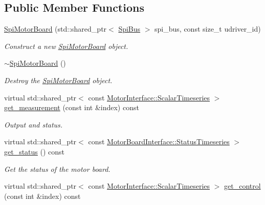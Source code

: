 \subsection*{Public Member Functions}
\begin{DoxyCompactItemize}
\item 
\hyperlink{classblmc__drivers_1_1SpiMotorBoard_a740572d586d73b678a177bc3de351f8b}{Spi\+Motor\+Board} (std\+::shared\+\_\+ptr$<$ \hyperlink{classblmc__drivers_1_1SpiBus}{Spi\+Bus} $>$ spi\+\_\+bus, const size\+\_\+t udriver\+\_\+id)
\begin{DoxyCompactList}\small\item\em Construct a new \hyperlink{classblmc__drivers_1_1SpiMotorBoard}{Spi\+Motor\+Board} object. \end{DoxyCompactList}\item 
\hyperlink{classblmc__drivers_1_1SpiMotorBoard_a3bc0c19b79504a96426646090c7fbc54}{$\sim$\+Spi\+Motor\+Board} ()
\begin{DoxyCompactList}\small\item\em Destroy the \hyperlink{classblmc__drivers_1_1SpiMotorBoard}{Spi\+Motor\+Board} object. \end{DoxyCompactList}\item 
virtual std\+::shared\+\_\+ptr$<$ const \hyperlink{classblmc__drivers_1_1MotorInterface_a49b8fc916b9f9debbd7b0988463db5cd}{Motor\+Interface\+::\+Scalar\+Timeseries} $>$ \hyperlink{classblmc__drivers_1_1SpiMotorBoard_ae0979b63fe72f5717a156fe670df6b32}{get\+\_\+measurement} (const int \&index) const 
\begin{DoxyCompactList}\small\item\em Output and status. \end{DoxyCompactList}\item 
virtual std\+::shared\+\_\+ptr$<$ const \hyperlink{classblmc__drivers_1_1MotorBoardInterface_ae3777e484dda60c4abe87f2b542ddfb8}{Motor\+Board\+Interface\+::\+Status\+Timeseries} $>$ \hyperlink{classblmc__drivers_1_1SpiMotorBoard_a74e1b0e71721f72769870b7c857f6d92}{get\+\_\+status} () const 
\begin{DoxyCompactList}\small\item\em Get the status of the motor board. \end{DoxyCompactList}\item 
virtual std\+::shared\+\_\+ptr$<$ const \hyperlink{classblmc__drivers_1_1MotorInterface_a49b8fc916b9f9debbd7b0988463db5cd}{Motor\+Interface\+::\+Scalar\+Timeseries} $>$ \hyperlink{classblmc__drivers_1_1SpiMotorBoard_a1b145982a241e234118269c7eeea8d42}{get\+\_\+control} (const int \&index) const 

\end{DoxyCompactItemize}
